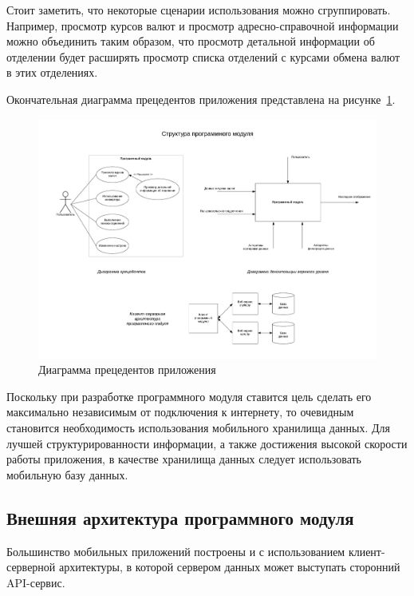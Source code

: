 Стоит заметить, что некоторые сценарии использования можно сгруппировать.
Например, просмотр курсов валют и просмотр адресно-справочной информации можно
объединить таким образом, что просмотр детальной информации об отделении будет
расширять просмотр списка отделений с курсами обмена валют в этих отделениях.

Окончательная диаграмма прецедентов приложения
представлена на рисунке~\ref{fig:use_case}.
\begin{figure}[h!]
  \centering
  \includegraphics[width=160mm]{fig/use_case}
  \caption{Диаграмма прецедентов приложения}
  \label{fig:use_case}
\end{figure}

Поскольку при разработке программного модуля ставится цель сделать его
максимально независимым от подключения к интернету, то очевидным становится
необходимость использования мобильного хранилища данных. Для лучшей
структурированности информации, а также достижения высокой скорости работы приложения,
в качестве хранилища данных следует использовать мобильную базу данных.

\pagebreak



\subsection{Внешняя архитектура программного модуля}

Большинство мобильных приложений построены и с использованием клиент-серверной
архитектуры, в которой сервером данных может выступать сторонний API-сервис.

